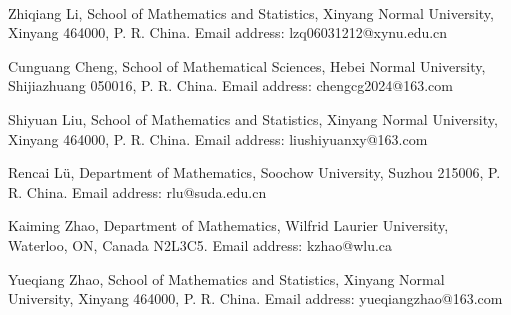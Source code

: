 \documentclass[12pt, a4paper]{amsart}
\theoremstyle{Theorem}
\theoremstyle{Theorem}
\numberwithin{equation}{section}
\begin{document}
\

Zhiqiang Li, School of Mathematics and Statistics,
Xinyang Normal University, Xinyang 464000, P. R. China. Email address: lzq06031212@xynu.edu.cn


\vskip 5pt

Cunguang Cheng, School of Mathematical Sciences, Hebei Normal University, Shijiazhuang 050016, P. R. China. Email address: chengcg2024@163.com 

\vskip 5pt

Shiyuan Liu, School of Mathematics and Statistics,
Xinyang Normal University, Xinyang 464000, P. R. China. Email address: liushiyuanxy@163.com

\vskip 5pt

Rencai L\"u,  Department of Mathematics, Soochow University, Suzhou 215006, P. R. China. Email address: rlu@suda.edu.cn

 
\vskip 5pt

Kaiming Zhao,  Department of Mathematics, Wilfrid Laurier University, Waterloo, ON, Canada N2L3C5. Email address: kzhao@wlu.ca

\vskip 5pt

Yueqiang Zhao, School of Mathematics and Statistics,
Xinyang Normal University, Xinyang 464000, P. R. China. Email address: yueqiangzhao@163.com
\end{document}
